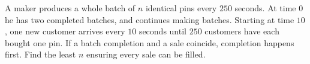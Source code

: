 A maker produces a whole batch of $n$ identical pins every $250$ seconds. At time $0$ he has two completed batches, and continues making batches. Starting at time $10$, one new customer arrives every $10$ seconds until $250$ customers have each bought one pin. If a batch completion and a sale coincide, completion happens first. Find the least $n$ ensuring every sale can be filled.
